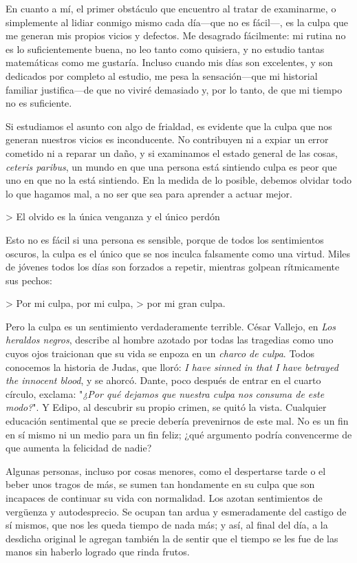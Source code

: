 \documentclass[a4paper, 12pt]{article}
\begin{document}
En cuanto a mí, el primer obstáculo que encuentro al tratar de examinarme, o simplemente al
lidiar conmigo mismo cada día---que no es fácil---, es la culpa que me generan
mis propios vicios y defectos. Me desagrado fácilmente: mi rutina no es lo
suficientemente buena, no leo tanto como quisiera, y no estudio tantas
matemáticas como me gustaría. Incluso cuando mis días son excelentes, y son
dedicados por completo al estudio, me pesa la sensación---que mi historial
familiar justifica---de que no viviré demasiado y, por lo tanto, de que mi
tiempo no es suficiente. 

Si estudiamos el asunto con algo de frialdad, es evidente que la culpa que nos
generan nuestros vicios es inconducente. No contribuyen ni a expiar un error
cometido ni a reparar un daño, y si examinamos el estado general de las cosas,
\textit{ceteris paribus}, un mundo en que una persona está sintiendo culpa es
peor que uno en que no la está sintiendo. En la medida de lo posible, debemos
olvidar todo lo que hagamos mal, a no ser que sea para aprender a actuar mejor.

> El olvido es la única venganza y el único perdón

Esto no es fácil si una persona es sensible, porque de todos los sentimientos
oscuros, la culpa es el único que se nos inculca falsamente como una virtud.
Miles de jóvenes todos los días son forzados a repetir, mientras golpean
rítmicamente sus pechos:

> Por mi culpa, por mi culpa,
> por mi gran culpa.

Pero la culpa es un sentimiento verdaderamente terrible. César Vallejo, en
\textit{Los heraldos negros}, describe al hombre azotado por todas las
tragedias como uno cuyos ojos traicionan que su vida se enpoza en un
\textit{charco de culpa}. Todos conocemos la historia de Judas, que lloró:
\textit{I have sinned in that I have betrayed the innocent blood}, y se ahorcó.
Dante, poco después de entrar en el cuarto círculo, exclama: "\textit{¿Por qué
dejamos que nuestra culpa nos consuma de este modo?}". Y Edipo, al descubrir su
propio crimen, se quitó la vista. Cualquier educación sentimental que se precie
debería prevenirnos de este mal. No es un fin en sí mismo ni un medio para un
fin feliz; ¿qué argumento podría convencerme de que aumenta la felicidad de
nadie?

Algunas personas, incluso por cosas menores, como el despertarse tarde o el
beber unos tragos de más, se sumen tan hondamente en su culpa que son incapaces
de continuar su vida con normalidad. Los azotan sentimientos de vergüenza y
autodesprecio. Se ocupan tan ardua y esmeradamente del castigo de sí mismos,
que nos les queda tiempo de nada más; y así, al final del día, a la desdicha
original le agregan también la de sentir que el tiempo se les fue de las manos
sin haberlo logrado que rinda frutos.
\end{document}
